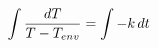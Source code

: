 \documentclass[preview]{standalone}
\begin{document}
\begin{align*}
\special{dvisvgm:raw <g id='unique000'>}\int \frac{dT}{T - T_{env}} = \int -k \, dt\special{dvisvgm:raw </g>}
\end{align*}
\end{document}
